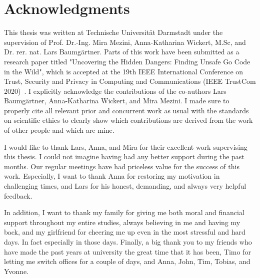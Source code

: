 \chapter*{Acknowledgments}

This thesis was written at Technische Universität Darmstadt under the supervision of Prof. Dr.-Ing. Mira Mezini,
Anna-Katharina Wickert, M.Sc, and Dr. rer. nat. Lars Baumgärtner.
Parts of this work have been submitted as a research paper titled "Uncovering the Hidden Dangers: Finding Unsafe Go Code
in the Wild", which is accepted at the 19th IEEE International Conference on Trust, Security and Privacy in
Computing and Communications (IEEE TrustCom 2020)~\cite{lauinger2020}.
I explicitly acknowledge the contributions of the co-authors Lars Baumgärtner, Anna-Katharina Wickert, and Mira Mezini.
I made sure to properly cite all relevant prior and concurrent work as usual with the standards on scientific ethics
to clearly show which contributions are derived from the work of other people and which are mine.

I would like to thank Lars, Anna, and Mira for their excellent work supervising this thesis.
I could not imagine having had any better support during the past months.
Our regular meetings have had priceless value for the success of this work.
Especially, I want to thank Anna for restoring my motivation in challenging times, and Lars for his honest,
demanding, and always very helpful feedback.

In addition, I want to thank my family for giving me both moral and financial support throughout my entire studies,
always believing in me and having my back, and my girlfriend for cheering me up even in the most stressful and hard
days.
In fact especially in those days.
Finally, a big thank you to my friends who have made the past years at university the great time that it has been, Timo
for letting me switch offices for a couple of days, and Anna, John, Tim, Tobias, and Yvonne.
